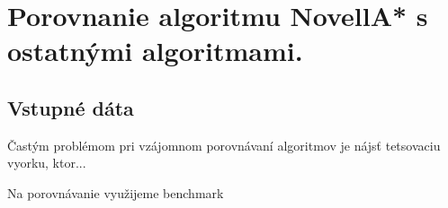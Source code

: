 \chapter{Porovnanie algoritmu NovellA* s ostatnými algoritmami.}

\section{Vstupné dáta}
Častým problémom pri vzájomnom porovnávaní algoritmov je
nájsť tetsovaciu vyorku, ktor...


Na porovnávanie využijeme benchmark